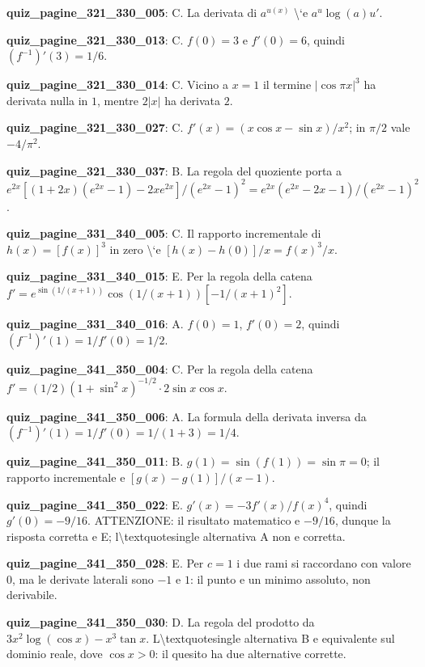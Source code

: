 \documentclass[11pt,a4paper]{article}
\newcounter{quiz}
\begin{document}
\noindent\textbf{quiz\_pagine\_321\_330\_005}: C. La derivata di $a^{u(x)}$ \textbackslash{}`e $a^u\log(a)u\prime$.\par\medskip
\noindent\textbf{quiz\_pagine\_321\_330\_013}: C. $f(0)=3$ e $f\prime(0)=6$, quindi $(f^{-1})\prime(3)=1/6$.\par\medskip
\noindent\textbf{quiz\_pagine\_321\_330\_014}: C. Vicino a $x=1$ il termine $|\cos\pi x|^3$ ha derivata nulla in $1$, mentre $2|x|$ ha derivata $2$.\par\medskip
\noindent\textbf{quiz\_pagine\_321\_330\_027}: C. $f\prime(x)=(x\cos x-\sin x)/x^2$; in $\pi/2$ vale $-4/\pi^2$.\par\medskip
\noindent\textbf{quiz\_pagine\_321\_330\_037}: B. La regola del quoziente porta a $e^{2x}[(1+2x)(e^{2x}-1)-2xe^{2x}]/(e^{2x}-1)^2=e^{2x}(e^{2x}-2x-1)/(e^{2x}-1)^2$.\par\medskip
\noindent\textbf{quiz\_pagine\_331\_340\_005}: C. Il rapporto incrementale di $h(x)=[f(x)]^3$ in zero \textbackslash{}`e $[h(x)-h(0)]/x=f(x)^3/x$.\par\medskip
\noindent\textbf{quiz\_pagine\_331\_340\_015}: E. Per la regola della catena $f\prime=e^{\sin(1/(x+1))}\cos(1/(x+1))[-1/(x+1)^2]$.\par\medskip
\noindent\textbf{quiz\_pagine\_331\_340\_016}: A. $f(0)=1$, $f\prime(0)=2$, quindi $(f^{-1})\prime(1)=1/f\prime(0)=1/2$.\par\medskip
\noindent\textbf{quiz\_pagine\_341\_350\_004}: C. Per la regola della catena $f\prime=(1/2)(1+\sin^2x)^{-1/2}\cdot2\sin x\cos x$.\par\medskip
\noindent\textbf{quiz\_pagine\_341\_350\_006}: A. La formula della derivata inversa da $(f^{-1})\prime(1)=1/f\prime(0)=1/(1+3)=1/4$.\par\medskip
\noindent\textbf{quiz\_pagine\_341\_350\_011}: B. $g(1)=\sin(f(1))=\sin\pi=0$; il rapporto incrementale e $[g(x)-g(1)]/(x-1)$.\par\medskip
\noindent\textbf{quiz\_pagine\_341\_350\_022}: E. $g\prime(x)=-3f\prime(x)/f(x)^4$, quindi $g\prime(0)=-9/16$. ATTENZIONE: il risultato matematico e $-9/16$, dunque la risposta corretta e E; l\textbackslash{}textquotesingle alternativa A non e corretta.\par\medskip
\noindent\textbf{quiz\_pagine\_341\_350\_028}: E. Per $c=1$ i due rami si raccordano con valore $0$, ma le derivate laterali sono $-1$ e $1$: il punto e un minimo assoluto, non derivabile.\par\medskip
\noindent\textbf{quiz\_pagine\_341\_350\_030}: D. La regola del prodotto da $3x^2\log(\cos x)-x^3\tan x$. L\textbackslash{}textquotesingle alternativa B e equivalente sul dominio reale, dove $\cos x>0$: il quesito ha due alternative corrette.\par\medskip
\end{document}
